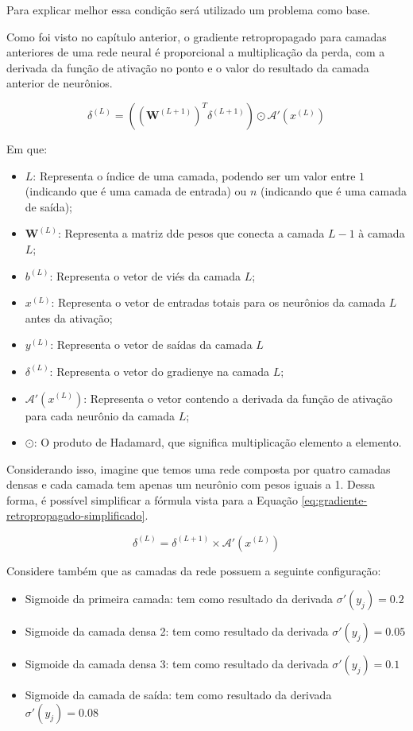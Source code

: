Para explicar melhor essa condição será utilizado um problema como base.

Como foi visto no capítulo anterior, o gradiente retropropagado para camadas anteriores de uma rede neural é proporcional a multiplicação da perda, com a derivada da função de ativação no ponto e o valor do resultado da camada anterior de neurônios. 

\[
    \delta^{(L)} = \left( \left( \textbf{W}^{(L+1)} \right)^T \delta^{(L+1)} \right)  \odot \mathcal{A}'(x^{(L)})
\]

Em que: 

\begin{itemize}
    \item $L$: Representa o índice de uma camada, podendo ser um valor entre $1$ (indicando que é uma camada de entrada) ou $n$ (indicando que é uma camada de saída);
    \item $\textbf{W}^{(L)}$: Representa a matriz dde pesos que conecta a camada $L - 1$ à camada $L$;
    \item $b^{(L)}$: Representa o vetor de viés da camada $L$;
    \item $x^{(L)}$: Representa o vetor de entradas totais para os neurônios da camada $L$ antes da ativação;
    \item $y^{(L)}$: Representa o vetor de saídas da camada $L$
    \item $\delta^{(L)}$: Representa o vetor do gradienye na camada $L$;
    \item $\mathcal{A}'(x^{(L)})$: Representa o vetor contendo a derivada da função de ativação para cada neurônio da camada $L$;
    \item $\odot$: O produto de Hadamard, que significa multiplicação elemento a elemento.
\end{itemize}

Considerando isso, imagine que temos uma rede composta por quatro camadas densas e cada camada tem apenas um neurônio com pesos iguais a 1. Dessa forma, é possível simplificar a fórmula vista para a Equação \ref{eq:gradiente-retropropagado-simplificado}.

\begin{equation}
        \delta^{(L)} =  \delta^{(L+1)} \times \mathcal{A}'(x^{(L)})
        \label{eq:gradiente-retropropagado-simplificado}
\end{equation}

Considere também que as camadas da rede possuem a seguinte configuração:

\begin{itemize}
    \item Sigmoide da primeira camada: tem como resultado da derivada $\sigma'(y_j) = 0.2$
    \item Sigmoide da camada densa 2: tem como resultado da derivada $\sigma'(y_j) = 0.05$
    \item Sigmoide da camada densa 3: tem como resultado da derivada $\sigma'(y_j) = 0.1$
    \item Sigmoide da camada de saída: tem como resultado da derivada $\sigma'(y_j) = 0.08$
\end{itemize}

